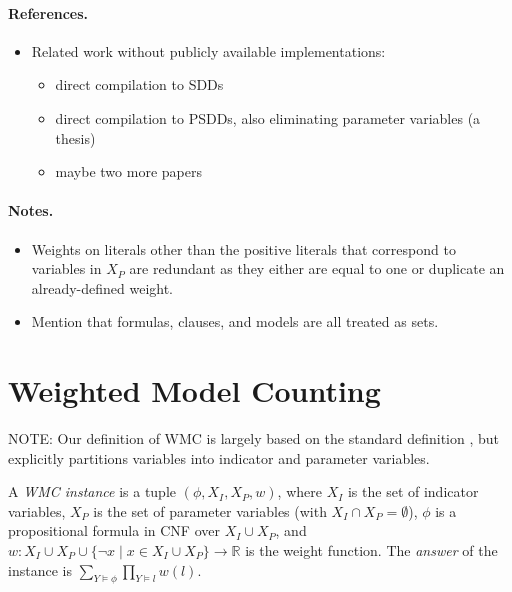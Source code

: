 \documentclass[runningheads]{llncs}
\begin{document}
\paragraph{References.}
\begin{itemize}
\item Related work without publicly available implementations:
  \begin{itemize}
  \item direct compilation to SDDs \cite{DBLP:conf/ecsqaru/ChoiKD13}
  \item direct compilation to PSDDs, also eliminating parameter variables (a thesis)
  \item maybe two more papers
  \end{itemize}
\end{itemize}

\paragraph{Notes.}
\begin{itemize}
\item Weights on literals other than the positive literals that correspond to
  variables in $X_P$ are redundant as they either are equal to one or duplicate
  an already-defined weight.
\item Mention that formulas, clauses, and models are all treated as sets.
\end{itemize}

\section{Weighted Model Counting}

NOTE: Our definition of WMC is largely based on the standard definition
\cite{DBLP:journals/ai/ChaviraD08}, but explicitly partitions variables into
indicator and parameter variables.

\begin{definition}
  A \emph{WMC instance} is a tuple $(\phi, X_I, X_P, w)$, where $X_I$ is
  the set of indicator variables, $X_P$ is the set of parameter variables (with
  $X_I \cap X_P = \emptyset$), $\phi$ is a propositional formula in CNF over
  $X_I \cup X_P$, and $w\colon X_I \cup X_P \cup \{\neg x \mid x \in X_I \cup
  X_P\} \to \mathbb{R}$ is the weight function. The \emph{answer} of the
  instance is $\sum_{Y \models \phi} \prod_{Y \models l} w(l)$.
\end{definition}
\end{document}

